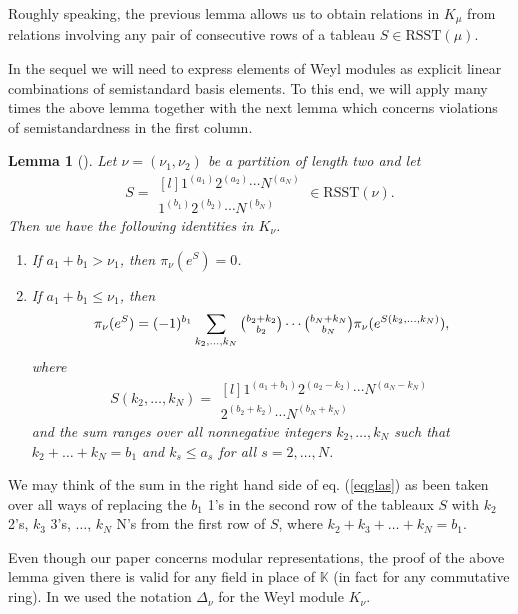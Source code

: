 \documentclass[11pt]{amsart}
\newtheorem{lem}[thm]{Lemma}
\theoremstyle{definition}
\numberwithin{equation}{section}
\begin{document}
Roughly speaking, the previous lemma allows us to obtain relations in $K_\mu$ from relations involving any pair of consecutive rows of a tableau $S \in \mathrm{RSST}(\mu)$. 

In the sequel we will need to express elements of Weyl modules as explicit linear combinations of semistandard basis elements.   To this end, we will apply many times the above lemma together with the next lemma which concerns violations of semistandardness in the first column. 
\begin{lem}[{\cite[Lemma 4.2]{MS3}}]\label{lemglas}Let $\nu=(\nu_1,\nu_2)$ be a partition of length two and let \[S=\begin{matrix*}[l]
		1^{(a_1)}2^{(a_2)}  \cdots   N^{(a_N)} \\
		1^{(b_1)}2^{(b_2)}  \cdots  N^{(b_N)}
	\end{matrix*} \in \mathrm{RSST} (\nu).\]
	Then we have the following identities in $K_{\nu}$.
	\begin{enumerate}
		\item If $a_1+b_1>\nu_1$, then $\pi_\nu(e^S)=0$.
		\item If $a_1+b_1 \le \nu_1$, then 
		\begin{equation}\label{eqglas}\pi_\nu(e^S)=(-1)^{b_1}\sum_{k_2,\dots,k_N}\tbinom{b_2+k_2}{b_2}\cdots\tbinom{b_N+k_N}{b_N}
	\pi_\nu(e^{S(k_2, \dots, k_N)}),
		\end{equation} where \[S(k_2,\dots,k_N)= \begin{matrix*}[l]
			1^{(a_1+b_1)}2^{(a_2-k_2)}  \cdots   N^{(a_N-k_N)} \\
			2^{(b_2+k_2)}  \cdots  N^{(b_N+k_N)}
		\end{matrix*}\] and the sum ranges over all  nonnegative integers $k_2,\dots,k_N$
		such that  $k_2+\dots+k_N=b_1 $ and $k_s \le a_s$ for all $s=2,\dots,N$.	\end{enumerate}	
\end{lem}
 We may think of the sum in the right hand side of eq. (\ref{eqglas}) as been taken over all ways of replacing the $b_1$ 1's in the second row of the tableaux $S$ with $k_2$ 2's, $k_3$ 3's, $\dots$, $k_N$ N's from the first row of $S$, where $k_2+ k_3+ \dots + k_N=b_1$. 
 
 Even though our paper \cite{MS3} concerns modular representations, the proof of the above lemma given there is valid for any field in place of $\mathbb{K}$ (in fact for any commutative ring). In \cite[Lemma 4.2]{MS3} we used the notation $\Delta_\nu$ for the Weyl module $K_\nu$. 
\end{document}
